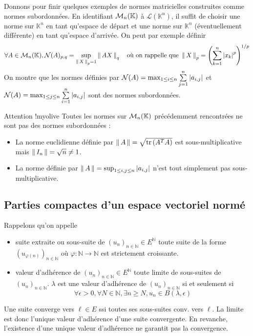     Donnons pour finir quelques exemples de normes matricielles construites comme normes subordonnées. En identifiant $\mathcal{M}_{n}(\mathbb{K})$ à $\mathcal{L}(\mathbb{K}^n)$, il suffit de choisir une norme sur $\mathbb{K}^n$ en tant qu’espace de départ et une norme sur $\mathbb{K}^n$ (éventuellement différente) en tant qu’espace d’arrivée. On peut par exemple définir 
    \[ \forall A \in \mathcal{M}_{n}(\mathbb{K}), \mathcal{N}(A)_{p,q} = \sup_{\left\lVert\,X\,\right\rVert_p= 1} \left\lVert\,AX\,\right\rVert_q \quad \text{où on rappelle que } \left\lVert\,X\,\right\rVert_p = \left(\sum\limits_{k=1}^n \left\lvert x_k\right\rvert^p\right)^{1/p} \]
    On montre que les normes définies par $\mathcal{N}(A) = \max_{1 \leq i \leq n} \sum\limits_{j=1}^n \left\lvert a_{i,j}\right\rvert$ et $\mathcal{N}(A) = \max_{1 \leq j \leq n} \sum\limits_{i =1}^n \left\lvert a_{i,j}\right\rvert$ sont des normes subordonnées.

    \begin{omed}{Attention !}{myolive}
        Toutes les normes sur $\mathcal{M}_{n}(\mathbb{K})$ précédemment rencontrées ne sont pas des normes subordonnées : 
        \begin{itemize}
            \item La norme euclidienne définie par $\left\lVert\,A\,\right\rVert = \sqrt{\operatorname{tr}\left(A^T A\right)}$ est sous-multiplicative mais $\left\lVert\,I_n\,\right\rVert = \sqrt{n} \neq 1$.
            \item La norme définie par $\left\lVert\,A\,\right\rVert = \sup_{1 \leq i,j \leq n} \left\lvert a_{i,j}\right\rvert$ n’est tout simplement pas sous-multiplicative.
        \end{itemize}
    \end{omed}

\subsection{Parties compactes d’un espace vectoriel normé}

    Rappelons qu’on appelle 
    \begin{itemize}
        \item suite extraite ou sous-suite de $(u_n)_{n \in \mathbb{N}} \in E^{\mathbb{N}}$ toute suite de la forme $(u_{\varphi(n)})_{n \in \mathbb{N}}$ où $\varphi : \mathbb{N} \rightarrow \mathbb{N}$ est strictement croissante.
        \item valeur d’adhérence de $(u_n)_{n \in \mathbb{N}} \in E^{\mathbb{N}}$ toute limite de sous-suites de $(u_n)_{n \in \mathbb{N}}$. $\lambda$ est une valeur d’adhérence de $(u_n)_{n \in \mathbb{N}}$ si et seulement si 
        \[ \forall \epsilon > 0, \forall N \in \mathbb{N}, \exists n \geq N, u_n \in B(\lambda,\epsilon) \]
    \end{itemize}
    Une suite converge vers $\ell \in E$ ssi toutes ses sous-suites conv. vers $\ell$. La limite est donc l’unique valeur d’adhérence d’une suite convergente. En revanche, l’existence d’une unique valeur d’adhérence ne garantit pas la convergence.

